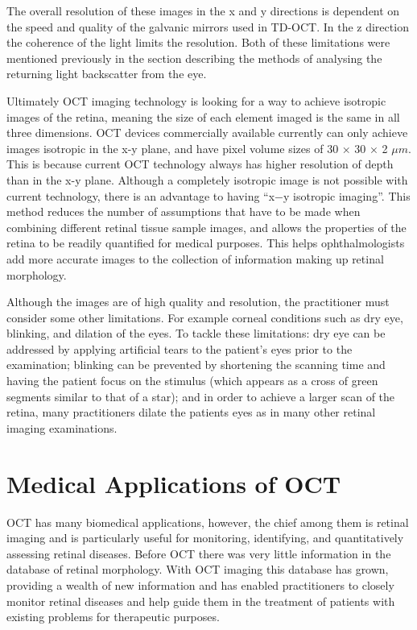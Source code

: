 The overall resolution of these images in the x and y directions is dependent on the
speed and quality of the galvanic mirrors used in TD-OCT.  In the z direction the
coherence of the light limits the resolution.  Both of these limitations were mentioned
previously in the section describing the methods of analysing the returning light
backscatter from the eye.

Ultimately OCT imaging technology is looking for a way to achieve isotropic images
of the retina, meaning the size of each element imaged is the same in all three
dimensions.  OCT devices commercially available currently can only achieve images
isotropic in the x-y plane, and have pixel volume sizes
of 30 × 30 × 2 $\mu m$. \cite{mbib_4}
This is because current OCT technology always has higher resolution of depth than
in the x-y plane. \cite{mbib_4}  Although a completely isotropic image is not possible
with current technology, there is an advantage to having “x−y isotropic imaging”.\cite{mbib_4} This method reduces the number of assumptions that 
have to be made when combining different retinal tissue sample
images, and allows the properties of the retina to be readily quantified for medical purposes.\cite{mbib_4} This helps ophthalmologists add more accurate images to the collection of information
making up retinal morphology.

Although the images are of high quality and resolution, the practitioner must consider
some other limitations.  For example corneal conditions such as dry eye, blinking, and
dilation of the eyes.  To tackle these limitations: dry eye can be addressed by applying
artificial tears to the patient’s eyes prior to the examination; blinking can be prevented
by shortening the scanning time and having the patient focus on the stimulus (which appears as a cross of green segments similar to that of a star); and in order to
achieve a larger scan of the retina, many practitioners dilate the patients eyes as
in many other retinal imaging examinations.\cite{mbib_4}

\section{Medical Applications of OCT}
OCT has many biomedical applications, however, the chief among them is retinal imaging and is particularly useful for monitoring, identifying, and quantitatively
assessing retinal diseases.\cite{mbib_9,mbib_4, mbib_5}  Before OCT there was
very little information in the database of retinal morphology.  With OCT imaging
this database has grown, providing a wealth of new information and has enabled
practitioners to closely  monitor retinal diseases and help guide them in the treatment
of patients with existing problems for therapeutic purposes.\cite{mbib_4}

